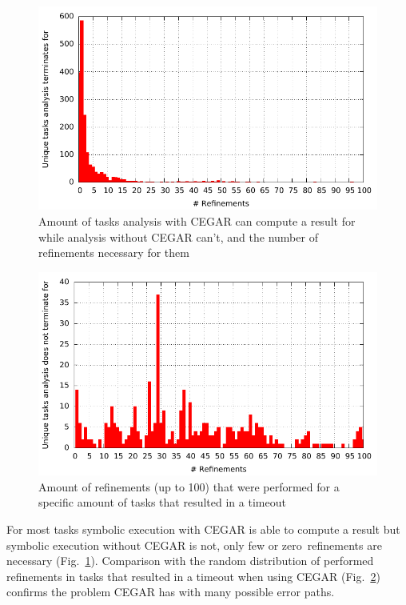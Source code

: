 \begin{figure}[h!]
\includegraphics{evaluation/hg_refinementsForUniqueCorrects}
\caption{Amount of tasks analysis with CEGAR can compute a result for while analysis without CEGAR can't, and the number of refinements necessary for them}
\label{fig:hgRefinementsForUniques}
\end{figure}
\begin{figure}[h!]
\includegraphics{evaluation/hg_refinementsForUniqueTimeouts}
\caption{Amount of refinements (up to 100) that were performed for a specific amount of tasks that resulted in a timeout}
\label{fig:hgRefinementsForTimeouts}
\end{figure}
For most tasks symbolic execution with CEGAR is able to compute a result but symbolic execution without CEGAR is not, only few or zero~refinements are necessary (Fig.~\ref{fig:hgRefinementsForUniques}).
Comparison with the random distribution of performed refinements in tasks that resulted in a timeout when using CEGAR (Fig.~\ref{fig:hgRefinementsForTimeouts}) confirms the problem CEGAR has with many possible error paths.

